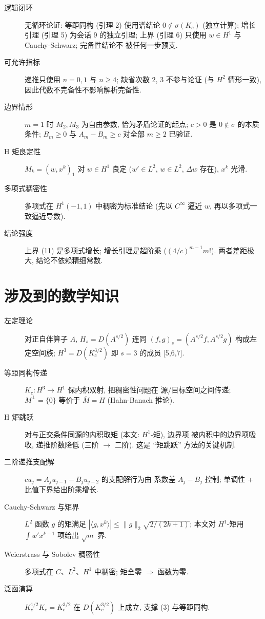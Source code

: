 \documentclass[UTF8]{ctexart}
\begin{document}
\begin{description}
	\item[逻辑闭环] 无循环论证: 等距同构 (引理 2) 使用谱结论 $0 \notin
		\sigma(K_c)$ (独立计算); 增长引理 (引理 5) 为会话 9 的独立引理;
		上界 (引理 6) 只使用 $w \in H^1$ 与 Cauchy-Schwarz; 完备性结论不
		被任何一步预支.
	\item[可允许指标] 递推只使用 $n = 0, 1$ 与 $n \geq 4$; 缺省次数 2, 3
		不参与论证 (与 $H^2$ 情形一致), 因此代数不完备性不影响解析完备性.
	\item[边界情形] $m = 1$ 时 $M_2, M_3$ 为自由参数, 恰为矛盾论证的起点;
		$c > 0$ 是 $0 \notin \sigma$ 的本质条件; $B_m \geq 0$ 与
		$A_m - B_m \geq c$ 对全部 $m \geq 2$ 已验证.
	\item[H 矩良定性] $M_k = (w, x^k)_1$ 对 $w \in H^1$ 良定 ($w' \in L^2$,
		$w \in L^2$, $\Delta w$ 存在), $x^k$ 光滑.
	\item[多项式稠密性] 多项式在 $H^1(-1,1)$ 中稠密为标准结论 (先以
		$C^\infty$ 逼近 $w$, 再以多项式一致逼近导数).
	\item[结论强度] 上界 (11) 是多项式增长; 增长引理是超阶乘 ($(4/c)^{m-1}m!$).
		两者差距极大, 结论不依赖精细常数.
\end{description}

\section{涉及到的数学知识}

\begin{description}
	\item[左定理论] 对正自伴算子 $A$, $H_s = D(A^{s/2})$ 连同
		$(f,g)_s = (A^{s/2}f, A^{s/2}g)$ 构成左定空间族; $H^3 = D(K_c^{3/2})$
		即 $s = 3$ 的成员 [5,6,7].
	\item[等距同构传递] $K_c: H^3 \to H^1$ 保内积双射, 把稠密性问题在
		源/目标空间之间传递; $M^\perp = \{0\}$ 等价于 $\overline M = H$
		(Hahn-Banach 推论).
	\item[H 矩跳跃] 对与正交条件同源的内积取矩 (本文: $H^1$-矩), 边界项
		被内积中的边界项吸收, 递推阶数降低 (三阶 $\to$ 二阶). 这是
		``矩跳跃'' 方法的关键机制.
	\item[二阶递推支配解] $c u_j = A_j u_{j-1} - B_j u_{j-2}$ 的支配解行为由
		系数差 $A_j - B_j$ 控制; 单调性 + 比值下界给出阶乘增长.
	\item[Cauchy-Schwarz 与矩界] $L^2$ 函数 $g$ 的矩满足
		$|\langle g, x^k \rangle| \leq \|g\|_2 \sqrt{2/(2k+1)}$; 本文对
		$H^1$-矩用 $\int w' x^{k-1}$ 项给出 $\sqrt m$ 界.
	\item[Weierstrass 与 Sobolev 稠密性] 多项式在 $C$、$L^2$、$H^1$ 中稠密;
		矩全零 $\Rightarrow$ 函数为零.
	\item[泛函演算] $K_c^{1/2}K_c = K_c^{3/2}$ 在 $D(K_c^{3/2})$ 上成立,
		支撑 (3) 与等距同构.
\end{description}
\end{document}

